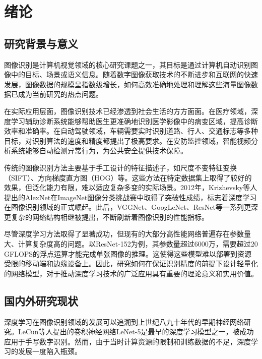 \chapter{绪论}

\section{研究背景与意义}

图像识别是计算机视觉领域的核心研究课题之一，其目标是通过计算机自动识别图像中的目标、场景或语义信息。随着数字图像获取技术的不断进步和互联网的快速发展，图像数据的规模呈指数级增长，如何高效准确地处理和理解这些海量图像数据已成为当前研究的热点问题。

在实际应用层面，图像识别技术已经渗透到社会生活的方方面面。在医疗领域，深度学习辅助诊断系统能够帮助医生更准确地识别医学影像中的病变区域，提高诊断效率和准确率。在自动驾驶领域，车辆需要实时识别道路、行人、交通标志等多种目标，对识别算法的速度和精度都提出了极高要求。在安防监控领域，智能视频分析系统能够自动检测异常行为，为公共安全提供技术保障。

传统的图像识别方法主要基于手工设计的特征描述子，如尺度不变特征变换（SIFT）、方向梯度直方图（HOG）等。这些方法在特定数据集上取得了较好的效果，但泛化能力有限，难以适应复杂多变的实际场景。2012年，Krizhevsky等人提出的AlexNet在ImageNet图像分类挑战赛中取得了突破性成绩，标志着深度学习在图像识别领域的正式崛起。此后，VGGNet、GoogLeNet、ResNet等一系列更深更复杂的网络结构相继被提出，不断刷新着图像识别的性能指标。

尽管深度学习方法取得了显著成功，但现有的大部分高性能网络普遍存在参数量大、计算复杂度高的问题。以ResNet-152为例，其参数量超过6000万，需要超过20 GFLOPS的浮点运算才能完成单张图像的推理。这使得这些模型难以部署到资源受限的移动端和边缘设备上。因此，研究如何在保证识别精度的前提下设计轻量化的网络模型，对于推动深度学习技术的广泛应用具有重要的理论意义和实用价值。

\section{国内外研究现状}

深度学习在图像识别领域的发展可以追溯到上世纪八九十年代的早期神经网络研究。LeCun等人提出的卷积神经网络LeNet-5是最早的深度学习模型之一，被成功应用于手写数字识别。然而，由于当时计算资源的限制和训练数据的不足，深度学习的发展一度陷入瓶颈。


